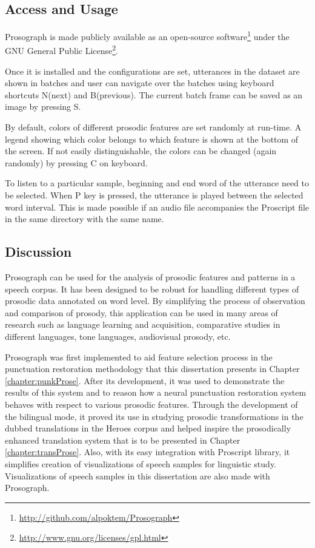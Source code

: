 \subsection{Access and Usage}
Prosograph is made publicly available as an open-source software\footnote{\url{http://github.com/alpoktem/Prosograph}} under the GNU General Public License\footnote{\url{http://www.gnu.org/licenses/gpl.html}}. 

Once it is installed and the configurations are set, utterances in the dataset are shown in batches and user can navigate over the batches using keyboard shortcuts N(next) and B(previous). The current batch frame can be saved as an image by pressing S. 


By default, colors of different prosodic features are set randomly at run-time. A legend showing which color belongs to which feature is shown at the bottom of the screen. If not easily distinguishable, the colors can be changed (again randomly) by pressing C on keyboard. 

To listen to a particular sample, beginning and end word of the utterance need to be selected. When P key is pressed, the utterance is played between the selected word interval. This is made possible if an audio file accompanies the Proscript file in the same directory with the same name. 

\subsection{Discussion}

Prosograph can be used for the analysis of prosodic features and patterns in a speech corpus. It has been designed to be robust for handling different types of prosodic data annotated on word level. By simplifying the process of observation and comparison of prosody, this application can be used in many areas of research such as language learning and acquisition, comparative studies in different languages, tone languages, audiovisual prosody, etc.

Prosograph was first implemented to aid feature selection process in the punctuation restoration methodology that this dissertation presents in Chapter \ref{chapter:punkProse}. After its development, it was used to demonstrate the results of this system and to reason how a neural punctuation restoration system behaves with respect to various prosodic features. Through the development of the bilingual mode, it proved its use in studying prosodic transformations in the dubbed translations in the Heroes corpus and helped inspire the prosodically enhanced translation system that is to be presented in Chapter \ref{chapter:transProse}. Also, with its easy integration with Proscript library, it simplifies creation of visualizations of speech samples for linguistic study. Visualizations of speech samples in this dissertation are also made with Prosograph. 

